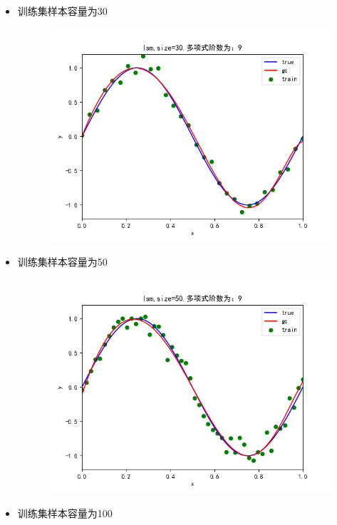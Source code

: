 \documentclass[lang=cn,a4paper,cite=authoryear]{elegantpaper}
\begin{document}
\begin{itemize}
	\item 训练集样本容量为30
	\begin{figure}[H]
		\centering
		\includegraphics[scale=0.5]{gc30}
	\end{figure}
	\item 训练集样本容量为50
	\begin{figure}[H]
		\centering
		\includegraphics[scale=0.5]{gc50}
	\end{figure}
	\item 训练集样本容量为100
	\begin{figure}[H]
		\centering

\end{figure}
\end{itemize}
\end{document}
